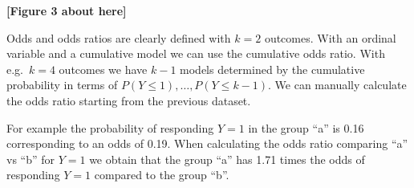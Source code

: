 \documentclass[
  man,floatsintext]{apa6}
\newenvironment{Shaded}{\begin{snugshade}}{\end{snugshade}}
\newcommand{\CommentTok}[1]{\textcolor[rgb]{0.56,0.35,0.01}{\textit{#1}}}
\newcommand{\ControlFlowTok}[1]{\textcolor[rgb]{0.13,0.29,0.53}{\textbf{#1}}}
\newcommand{\DecValTok}[1]{\textcolor[rgb]{0.00,0.00,0.81}{#1}}
\newcommand{\FunctionTok}[1]{\textcolor[rgb]{0.13,0.29,0.53}{\textbf{#1}}}
\newcommand{\NormalTok}[1]{#1}
\newcommand{\OtherTok}[1]{\textcolor[rgb]{0.56,0.35,0.01}{#1}}
\newcommand{\SpecialCharTok}[1]{\textcolor[rgb]{0.81,0.36,0.00}{\textbf{#1}}}
\newcommand{\StringTok}[1]{\textcolor[rgb]{0.31,0.60,0.02}{#1}}
\begin{document}
\begin{center}\textbf{[Figure 3 about here]} \end{center}

\normalsize

Odds and odds ratios are clearly defined with \(k = 2\) outcomes. With an ordinal variable and a cumulative model we can use the cumulative odds ratio. With e.g.~\(k = 4\) outcomes we have \(k - 1\) models determined by the cumulative probability in terms of \(P(Y \leq 1), \dots, P(Y \leq k - 1)\). We can manually calculate the odds ratio starting from the previous dataset.

\scriptsize

\begin{Shaded}
\end{Shaded}

\normalsize

For example the probability of responding \(Y = 1\) in the group ``a'' is 0.16 corresponding to an odds of 0.19. When calculating the odds ratio comparing ``a'' vs ``b'' for \(Y = 1\) we obtain that the group ``a'' has 1.71 times the odds of responding \(Y = 1\) compared to the group ``b''.
\end{document}
